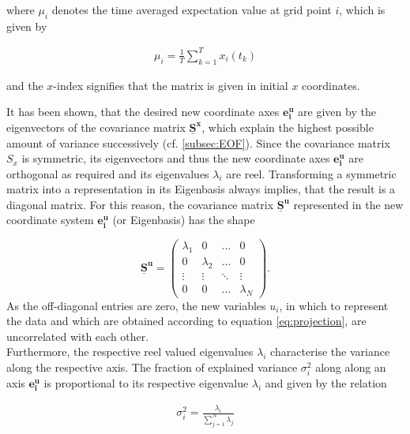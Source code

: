 where $\mu_i$ denotes the time averaged expectation value at grid point $i$, which is given by

\begin{align*}
	\mu_i=\frac{1}{T}\sum\limits_{k=1}^Tx_i(t_k)	
\end{align*}

and the $x$-index signifies that the matrix is given in initial $x$ coordinates.


It has been shown, that the desired new coordinate axes $\bm{e_i^u}$ are given by the eigenvectors of the covariance matrix $\bm{\underline{S}^x}$, which explain the highest possible amount of variance successively (cf. \ref{subsec:EOF}).
Since the covariance matrix $S_x$ is symmetric, its eigenvectors and thus the new coordinate axes $\bm{e_i^u}$ are orthogonal as required and its eigenvalues $\lambda_i$ are reel.
Transforming a symmetric matrix into a representation in its Eigenbasis always implies, that the result is a diagonal matrix. For this reason, the covariance matrix $\bm{\underline{S}^u}$ represented in the new coordinate system $\bm{e_i^u}$ (or Eigenbasis) has the shape

\[
\bm{\underline{S}^u}=
  \begin{pmatrix}
    \lambda_1 & 0 & \dots & 0 \\
    0 & \lambda_2 & \dots & 0 \\
    \vdots & \vdots & \ddots & \vdots \\
    0 & 0 & \dots & \lambda_N
  \end{pmatrix}
  .
\]
As the off-diagonal entries are zero, the new variables $u_i$, in which to represent the data and which are obtained according to equation \ref{eq:projection}, are uncorrelated with each other.\\
Furthermore, the respective reel valued eigenvalues $\lambda_i$ characterise the variance along the respective axis. The fraction of explained variance $\sigma_i^2$ along along an axis $\bm{e_{i}^u}$ is proportional to its respective eigenvalue $\lambda_i$ and given by the relation

\begin{align*}
	\sigma_i^2=\frac{\lambda_i}{\sum\limits_{j=1}^N \lambda_j}
\end{align*}


